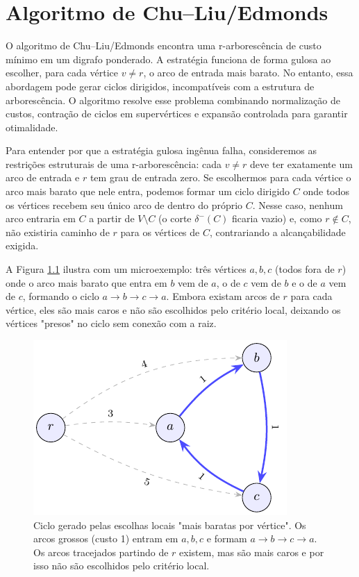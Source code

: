 \chapter{Algoritmo de Chu–Liu/Edmonds}

O algoritmo de Chu–Liu/Edmonds encontra uma r-arborescência de custo mínimo em um digrafo ponderado. A estratégia funciona de forma gulosa ao escolher, para cada vértice \(v\neq r\), o arco de entrada mais barato. No entanto, essa abordagem pode gerar ciclos dirigidos, incompatíveis com a estrutura de arborescência. O algoritmo resolve esse problema combinando normalização de custos, contração de ciclos em supervértices e expansão controlada para garantir otimalidade.

Para entender por que a estratégia gulosa ingênua falha, consideremos as restrições estruturais de uma r-arborescência: cada \(v\neq r\) deve ter exatamente um arco de entrada e \(r\) tem grau de entrada zero. Se escolhermos para cada vértice o arco mais barato que nele entra, podemos formar um ciclo dirigido \(C\) onde todos os vértices recebem seu único arco de dentro do próprio \(C\). Nesse caso, nenhum arco entraria em \(C\) a partir de \(V\setminus C\) (o corte \(\delta^-(C)\) ficaria vazio) e, como \(r\notin C\), não existiria caminho de \(r\) para os vértices de \(C\), contrariando a alcançabilidade exigida.

A Figura \ref{fig:chu-liu-cycle-micro} ilustra com um microexemplo: três vértices \(a,b,c\) (todos fora de \(r\)) onde o arco mais barato que entra em \(b\) vem de \(a\), o de \(c\) vem de \(b\) e o de \(a\) vem de \(c\), formando o ciclo \(a\to b\to c\to a\). Embora existam arcos de \(r\) para cada vértice, eles são mais caros e não são escolhidos pelo critério local, deixando os vértices "presos" no ciclo sem conexão com a raiz.

\begin{figure}[H]
    \centering
    \includegraphics[width=0.9\linewidth]{figures/fig_chu_liu_cycle_micro.pdf}
    \caption{Ciclo gerado pelas escolhas locais "mais baratas por vértice". Os arcos grossos (custo 1) entram em \(a,b,c\) e formam \(a\to b\to c\to a\). Os arcos tracejados partindo de \(r\) existem, mas são mais caros e por isso não são escolhidos pelo critério local.}
    \label{fig:chu-liu-cycle-micro}
\end{figure}

